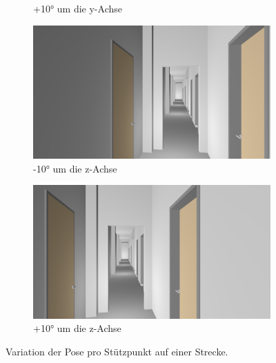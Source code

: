 \begin{figure}[H]
\begin{subfigure}[t]{0.18\linewidth}
		\caption{+10° um die y-Achse}
		\label{subfig:iz0_y+10}
	\end{subfigure}
	\hfill
	\begin{subfigure}[t]{0.18\linewidth}
		\centering
		\includegraphics[width=\linewidth]{images/syn_dataset/00024.png}
		\caption{-10° um die z-Achse}
		\label{subfig:iz-10_y0}
	\end{subfigure}
	\hfill
	\begin{subfigure}[t]{0.18\linewidth}
		\centering
		\includegraphics[width=\linewidth]{images/syn_dataset/00022.png}
		\caption{+10° um die z-Achse}
		\label{subfig:iz+10_y0}
	\end{subfigure}
	\caption{Variation der Pose pro Stützpunkt auf einer Strecke.}
	\label{fig:dataset_variation}
\end{figure}

